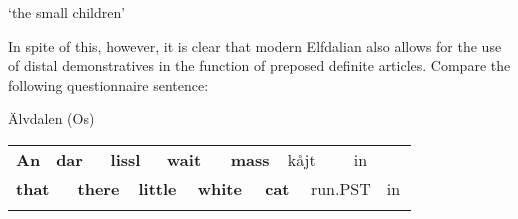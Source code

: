 \begin{styleTranslation}
‘the small children’

\end{styleTranslation}

\begin{styleBodyTextFirst}
In spite of this, however, it is clear that modern Elfdalian also allows for the use of distal demonstratives in the function of preposed definite articles. Compare the following questionnaire sentence:

\end{styleBodyTextFirst}


\begin{listWWNumileveli}
\item {}

\begin{styleExample}
Älvdalen (Os)

\end{styleExample}

\end{listWWNumileveli}

\begin{tabular}{llllllllllllll}
\lsptoprule
{\bfseries An} & \multicolumn{2}{l}{{\bfseries dar}

} & \multicolumn{2}{l}{{\bfseries lissl}

} & \multicolumn{2}{l}{{\bfseries wait}

} & \multicolumn{2}{l}{{\bfseries mass}

} & \multicolumn{2}{l}{kåjt

} & \multicolumn{2}{l}{in

} & \\
\multicolumn{2}{l}{{\bfseries that}

} & \multicolumn{2}{l}{{\bfseries there}

} & \multicolumn{2}{l}{{\bfseries little}

} & \multicolumn{2}{l}{{\bfseries white}

} & \multicolumn{2}{l}{{\bfseries cat}

} & \multicolumn{2}{l}{run.PST

} & \multicolumn{2}{l}{in

}\\
\lspbottomrule
\end{tabular}

